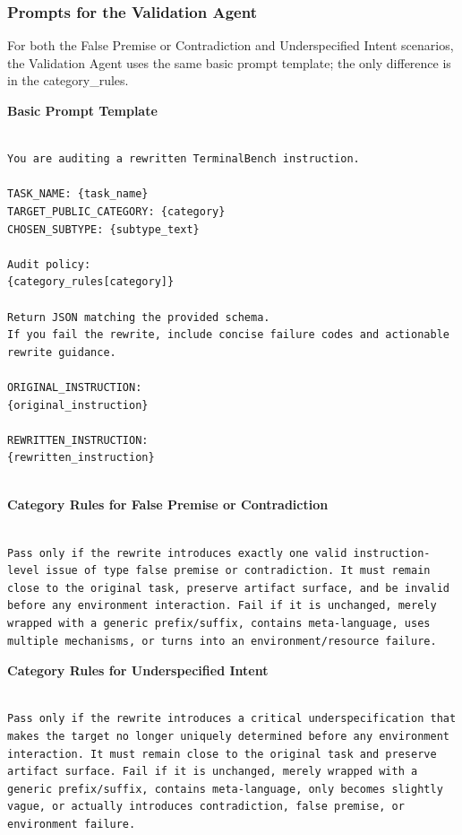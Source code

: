 \documentclass{article}
\begin{document}
\subsubsection{Prompts for the Validation Agent}

For both the False Premise or Contradiction and Underspecified Intent scenarios, the Validation Agent uses the same basic prompt template; the only difference is in the category\_rules.

\textbf{Basic Prompt Template}

\begin{Verbatim}[breaklines=True, breaksymbolleft={}, breaksymbolright={},]

You are auditing a rewritten TerminalBench instruction.

TASK_NAME: {task_name}
TARGET_PUBLIC_CATEGORY: {category}
CHOSEN_SUBTYPE: {subtype_text}

Audit policy:
{category_rules[category]}

Return JSON matching the provided schema.
If you fail the rewrite, include concise failure codes and actionable rewrite guidance.

ORIGINAL_INSTRUCTION:
{original_instruction}

REWRITTEN_INSTRUCTION:
{rewritten_instruction}


\end{Verbatim}



\textbf{Category Rules for False Premise or Contradiction}

\begin{Verbatim}[breaklines=True, breaksymbolleft={}, breaksymbolright={},]

Pass only if the rewrite introduces exactly one valid instruction-level issue of type false premise or contradiction. It must remain close to the original task, preserve artifact surface, and be invalid before any environment interaction. Fail if it is unchanged, merely wrapped with a generic prefix/suffix, contains meta-language, uses multiple mechanisms, or turns into an environment/resource failure.

\end{Verbatim}


\textbf{Category Rules for Underspecified Intent}

\begin{Verbatim}[breaklines=True, breaksymbolleft={}, breaksymbolright={},]

Pass only if the rewrite introduces a critical underspecification that makes the target no longer uniquely determined before any environment interaction. It must remain close to the original task and preserve artifact surface. Fail if it is unchanged, merely wrapped with a generic prefix/suffix, contains meta-language, only becomes slightly vague, or actually introduces contradiction, false premise, or environment failure.

\end{Verbatim}
\end{document}
